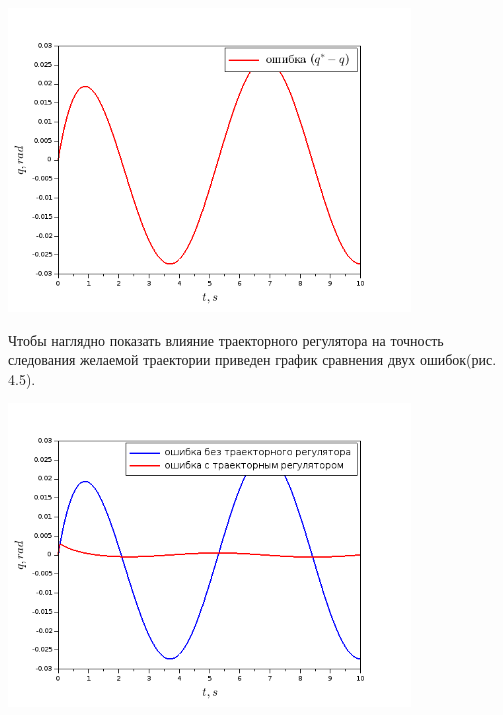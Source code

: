 \begin{center}
    \includegraphics[width=0.8\textwidth]{Lab4/images/Error_without.png}\\
\end{center}
\newpage
Чтобы наглядно показать влияние траекторного регулятора на точность следования желаемой траектории приведен график сравнения двух ошибок(рис. 4.5).
\begin{center}
    \includegraphics[width=0.8\textwidth]{Lab4/images/Error_comparison.png}\\
\end{center}